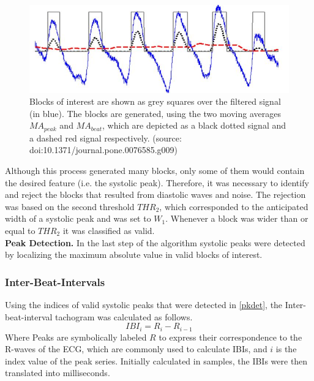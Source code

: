 \begin{figure}[ht]
	\centering
  \includegraphics[width=1.0\textwidth, angle=0]{images/bvp_dta.jpg}
	\caption[Peak Detection Algorithm]{Blocks of interest are shown as grey squares over the filtered signal (in blue). The blocks are generated, using the two moving averages $MA_{peak}$ and $MA_{beat}$, which are depicted as a black dotted signal and a dashed red signal respectively. (source: doi:10.1371/journal.pone.0076585.g009)}
	\label{bvp_dta}
\end{figure}

Although this process generated many blocks, only some of them would contain the desired feature (i.e. the systolic peak). Therefore, it was necessary to identify and reject the blocks that resulted from diastolic waves and noise. The rejection was based on the second threshold $THR_{2}$, which corresponded to the anticipated width of a systolic peak and was set to $W_{1}$. Whenever a block was wider than or equal to $THR_{2}$ it was classified as valid.\\
\textbf{Peak Detection.}\label{pkdet} In the last step of the algorithm systolic peaks were detected by localizing the maximum absolute value in valid blocks of interest. 

\subsubsection{Inter-Beat-Intervals}
Using the indices of valid systolic peaks that were detected in \ref{pkdet}, the Inter-beat-interval tachogram was calculated as follows.
\begin{equation}
IBI_{i} = R_{i}-R_{i-1}
\end{equation}
Where Peaks are symbolically labeled $R$ to express their correspondence to the R-waves of the ECG, which are commonly used to calculate IBIs, and $i$ is the index value of the peak series.
Initially calculated in samples, the IBIs were then translated into milliseconds.

